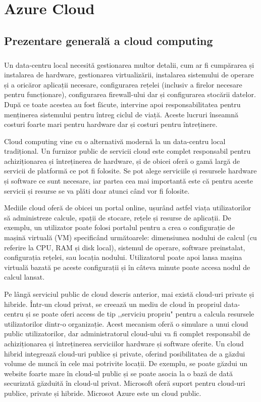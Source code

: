 \chapter{Azure Cloud}

\section{Prezentare generală a cloud computing}
\vspace{1cm}
\paragraph{ } Un data-centru local necesită gestionarea multor detalii, cum ar fi cumpărarea și instalarea de hardware, gestionarea virtualizării, instalarea sistemului de operare și  a oricăror aplicații necesare, configurarea rețelei (inclusiv a firelor necesare pentru funcționare), configurarea firewall-ului dar și configurarea stocării datelor. După ce toate acestea au fost făcute, intervine apoi responsabilitatea pentru menținerea sistemului pentru întreg ciclul de viață. Aceste lucruri înseamnă costuri foarte mari pentru hardware dar și costuri pentru întreținere.

Cloud computing vine cu o alternativă modernă la un data-centru local tradițional. Un furnizor public de servicii cloud este complet responsabil pentru achiziționarea și întreținerea de hardware, și de obicei oferă o gamă largă de servicii de platformă ce pot fi folosite. Se pot alege serviciile și resursele hardware și software ce sunt necesare, iar partea cea mai importantă este că pentru aceste servicii și resurse se va plăti doar atunci când vor fi folosite.

Mediile cloud oferă de obicei un portal online, ușurând astfel viața utilizatorilor să administreze calcule, spații de stocare, rețele și resurse de aplicații. De exemplu, un utilizator poate folosi portalul pentru a crea o configurație de mașină virtuală (VM) specificând următoarele: dimensiunea nodului de calcul (cu referire la CPU, RAM și disk local), sistemul de operare, software preinstalat, configurația rețelei, sau locația nodului. Utilizatorul poate apoi lansa mașina virtuală bazată pe aceste configurații și în câteva minute poate accesa nodul de calcul lansat.\cite{20}\newpage

Pe lângă serviciul public de cloud descris anterior, mai există cloud-uri private și hibride. Într-un cloud privat, se creează un mediu de cloud în propriul data-centru și se poate oferi access de tip ,,serviciu propriu" pentru a calcula resursele utilizatorilor dintr-o organizație. Acest mecanism oferă o simulare a unui cloud public utilizatorilor, dar administratorul cloud-ului va fi complet responsabil de achiziționarea și întreținerea serviciilor hardware și software oferite. Un cloud hibrid integrează cloud-uri publice și private, oferind  posibilitatea de a găzdui volume de muncă în cele mai potrivite locații. De exemplu, se poate găzdui un website foarte mare în cloud-ul public și se poate asocia la o bază de dată securizată găzduită în cloud-ul privat.
Microsoft oferă suport pentru cloud-uri publice, private și hibride. Microsot Azure este un cloud public.

